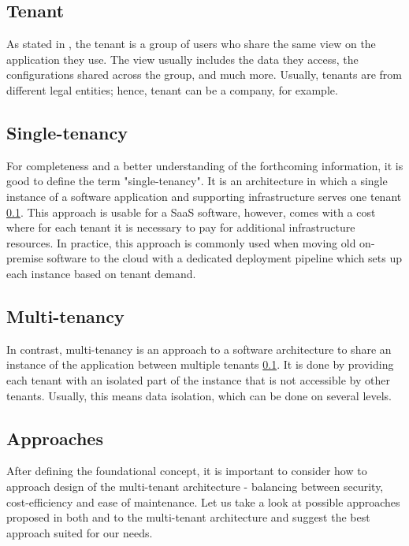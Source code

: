 \subsection{Tenant}
\label{subsec:tenant}
As stated in \cite{MultitennancyArchitecture2012}, the tenant is a group of users who share the same view on the application they use.
The view usually includes the data they access, the configurations shared across the group, and much more.
Usually, tenants are from different legal entities; hence, tenant can be a company, for example.

\subsection{Single-tenancy}
For completeness and a better understanding of the forthcoming information, it is good to define the term "single-tenancy".
It is an architecture in which a single instance of a software application and supporting infrastructure serves one tenant  \ref{subsec:tenant}.
This approach is usable for a \ac{SaaS} software, however, comes with a cost where for each tenant it is necessary to pay for additional infrastructure resources.
In practice, this approach is commonly used when moving old on-premise software to the cloud with a dedicated deployment pipeline which sets up each instance based on tenant demand. 


\subsection{Multi-tenancy}
In contrast, multi-tenancy is an approach to a software architecture to share an instance of the application between multiple tenants \ref{subsec:tenant}.
It is done by providing each tenant with an isolated part of the instance that is not accessible by other tenants.
Usually, this means data isolation, which can be done on several levels.

\subsection{Approaches}
After defining the foundational concept, it is important to consider how to approach design of the multi-tenant architecture - balancing between security, cost-efficiency and ease of maintenance.
Let us take a look at possible approaches proposed in both \cite{MultitennancyArchitecture2012} and \cite{MultitenancyArchitectureMedium} to the multi-tenant architecture and suggest the best approach suited for our needs.

